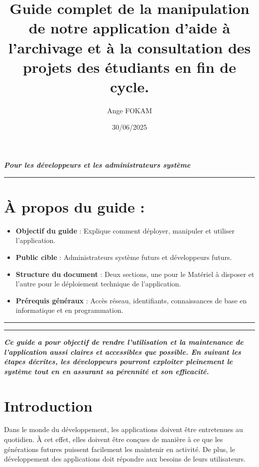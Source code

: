 \documentclass[12pt]{article}
\title{Guide complet de la manipulation de notre application d’aide à l’archivage et à la consultation des projets des étudiants en fin de cycle.}
\author{Ange FOKAM}
\date{30/06/2025}
\begin{document}
\maketitle
\clearpage

\tableofcontents
\clearpage

\textbf{\textit{Pour les développeurs et les administrateurs système}}

\rule{\linewidth}{0.2pt}

\section*{À propos du guide :}

\begin{itemize}[label=--]
    \item \textbf{Objectif du guide} : Explique comment déployer, manipuler et utiliser l'application.
    \item \textbf{Public cible} : Administrateurs système futurs et développeurs futurs.
    \item \textbf{Structure du document} : Deux sections, une pour le Matériel à disposer et l'autre pour le déploiement technique de l'application.
    \item \textbf{Prérequis généraux} : Accès réseau, identifiants, connaissances de base en informatique et en programmation.
\end{itemize}

\rule{\linewidth}{0.2pt}

\vfill
\rule{\linewidth}{0.2pt}
\textbf{\textit{Ce guide a pour objectif de rendre l’utilisation et la maintenance de l’application aussi claires et accessibles
que possible. En suivant les étapes décrites, les développeurs pourront exploiter pleinement le système tout en en assurant sa 
pérennité et son efficacité.}}

\newpage

{\fontsize{14}{16}\section*{Introduction}}
Dans le monde du développement, les applications doivent être entretenues au quotidien.
À cet effet, elles doivent être conçues de manière à ce que les générations futures puissent
facilement les maintenir en activité. De plus, le développement des applications doit répondre
aux besoins de leurs utilisateurs.
\end{document}
